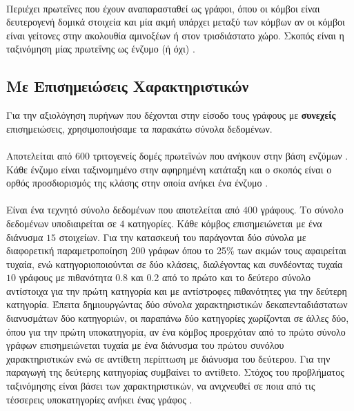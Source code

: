 \paragraph*{} Περιέχει πρωτεΐνες που έχουν αναπαρασταθεί ως γράφοι, όπου οι κόμβοι είναι δευτερογενή δομικά στοιχεία και μία ακμή υπάρχει μεταξύ των κόμβων αν οι κόμβοι είναι γείτονες στην ακολουθία αμινοξέων ή στον τρισδιάστατο χώρο.
Σκοπός είναι η ταξινόμηση μίας πρωτεΐνης ως ένζυμο (ή όχι) \cite{borgwardt2005protein}.

\subsection{Με Επισημειώσεις Χαρακτηριστικών}
\label{ssec:atr}
Για την αξιολόγηση πυρήνων που δέχονται στην είσοδο τους γράφους με \textbf{συνεχείς} επισημειώσεις, χρησιμοποιήσαμε τα παρακάτω σύνολα δεδομένων.

\paragraph*{} Αποτελείται από $600$ τριτογενείς δομές πρωτεϊνών που ανήκουν στην βάση ενζύμων .
Κάθε ένζυμο είναι ταξινομημένο στην αφηρημένη κατάταξη  και ο σκοπός είναι ο ορθός προσδιορισμός της κλάσης στην οποία ανήκει ένα ένζυμο \cite{Borgwardt2005}.

\paragraph*{} Είναι ένα τεχνητό σύνολο δεδομένων που αποτελείται από $400$ γράφους.
Το σύνολο δεδομένων υποδιαιρείται σε $4$ κατηγορίες.
Κάθε κόμβος επισημειώνεται με ένα διάνυσμα $15$ στοιχείων.
Για την κατασκευή του παράγονται δύο σύνολα με διαφορετική παραμετροποίηση $200$ γράφων  όπου το 25\% των ακμών τους αφαιρείται τυχαία, ενώ κατηγοριοποιούνται σε δύο κλάσεις, διαλέγοντας και συνδέοντας τυχαία $10$ γράφους με πιθανότητα 0.8 και 0.2 από το πρώτο και το δεύτερο σύνολο αντίστοιχα για την πρώτη κατηγορία και με αντίστροφες πιθανότητες για την δεύτερη κατηγορία.
Έπειτα δημιουργώντας δύο σύνολα χαρακτηριστικών δεκαπενταδιάστατων διανυσμάτων δύο κατηγοριών, οι παραπάνω δύο κατηγορίες χωρίζονται σε άλλες δύο, όπου για την πρώτη υποκατηγορία, αν ένα κόμβος προερχόταν από το πρώτο σύνολο γράφων επισημειώνεται τυχαία με ένα διάνυσμα του πρώτου συνόλου χαρακτηριστικών ενώ σε αντίθετη περίπτωση με διάνυσμα του δεύτερου.
Για την παραγωγή της δεύτερης κατηγορίας συμβαίνει το αντίθετο.
Στόχος του προβλήματος ταξινόμησης είναι βάσει των χαρακτηριστικών, να ανιχνευθεί σε ποια από τις τέσσερεις υποκατηγορίες ανήκει ένας γράφος \cite{Morris16}.


